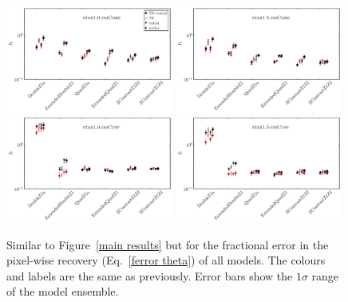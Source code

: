 \documentclass[galley,usenatbib]{mn2e}
\newcommand{\figref}[1] {Figure~\ref{#1}}
\newcommand{\eqnrefp}[1] {(Eq.~\ref{#1})}
\begin{document}
\begin{figure}
\includegraphics[width=0.49\textwidth]{AAferror-1sig.pdf}
\includegraphics[width=0.49\textwidth]{BBferror-1sig.pdf}\\
\includegraphics[width=0.49\textwidth]{ACferror-1sig.pdf}
\includegraphics[width=0.49\textwidth]{BCferror-1sig.pdf}
\caption{Similar to \figref{main results} but for the fractional error
in the pixel-wise recovery \eqnrefp{ferror theta} of all models. The colours and labels are the same
as previously. Error bars show the $1\sigma$ range of the model ensemble.}
\label{main results pixel-wise}
\end{figure}
\end{document}
